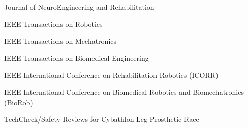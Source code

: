
\newpage
{}
\begin{cventries}

\cventry
    { } %
    { } %
    {} %
    {} %
    {
\begin{cvitems}
\item{Journal of NeuroEngineering and Rehabilitation}
\item{IEEE Transactions on Robotics}%
\item{IEEE Transactions on Mechatronics}
\item{IEEE Transactions on Biomedical Engineering}
\item{IEEE International Conference on Rehabilitation Robotics (ICORR)}
\item{IEEE International Conference on Biomedical Robotics and Biomechatronics (BioRob)}  %
\item{TechCheck/Safety Reviews for Cybathlon Leg Prosthetic Race}
\end{cvitems}
}


\end{cventries}
